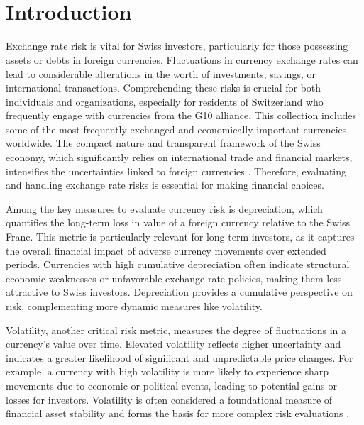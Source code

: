 \documentclass[11pt,a4paper,english,oneside]{book}
\begin{document}
\thispagestyle{empty}
\titleGP\


\doublespacing\
\setcounter{page}{1}


\tableofcontents
\listoffigures
\listoftables



\chapter{Introduction}

Exchange rate risk is vital for Swiss investors, particularly for those possessing assets or debts in foreign currencies. Fluctuations in currency exchange rates can lead to considerable alterations in the worth of investments, savings, or international transactions. Comprehending these risks is crucial for both individuals and organizations, especially for residents of Switzerland who frequently engage with currencies from the G10 alliance. This collection includes some of the most frequently exchanged and economically important currencies worldwide. The compact nature and transparent framework of the Swiss economy, which significantly relies on international trade and financial markets, intensifies the uncertainties linked to foreign currencies \parencite{frohm2024strengthening}. Therefore, evaluating and handling exchange rate risks is essential for making financial choices.

Among the key measures to evaluate currency risk is depreciation, which quantifies the long-term loss in value of a foreign currency relative to the Swiss Franc. This metric is particularly relevant for long-term investors, as it captures the overall financial impact of adverse currency movements over extended periods. Currencies with high cumulative depreciation often indicate structural economic weaknesses or unfavorable exchange rate policies, making them less attractive to Swiss investors. Depreciation provides a cumulative perspective on risk, complementing more dynamic measures like volatility.

Volatility, another critical risk metric, measures the degree of fluctuations in a currency’s value over time. Elevated volatility reflects higher uncertainty and indicates a greater likelihood of significant and unpredictable price changes. For example, a currency with high volatility is more likely to experience sharp movements due to economic or political events, leading to potential gains or losses for investors. Volatility is often considered a foundational measure of financial asset stability and forms the basis for more complex risk evaluations \parencite{poon2003forecasting}.
\end{document}
